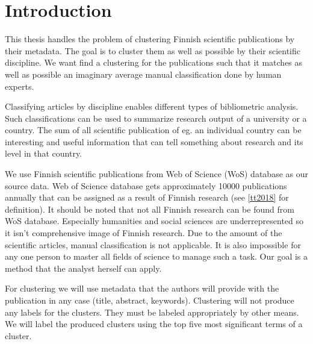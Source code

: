 \chapter{Introduction}
\label{chapter:intro}
This thesis handles the problem of clustering Finnish scientific 
publications by their metadata. The goal is to cluster 
them as well as possible by their scientific discipline. We want 
find a clustering for the publications such that it matches 
as well as possible an imaginary average manual classification 
done by human experts.

Classifying articles by discipline enables different types of 
bibliometric analysis. Such classifications can be used to 
summarize research output of a university or a country.
The sum of all scientific publication of eg. an individual country can be 
interesting and useful information that can tell something about 
research and its level in that country.

We use Finnish scientific publications from  Web of Science (WoS)
database as our source data. 
Web of Science database gets approximately 10000 publications 
annually that can be assigned as a result of Finnish research (see 
\ref{tt2018} for definition).
It should be noted that not all Finnish research can be found from
WoS database. Especially humanities and social sciences are 
underrepresented so it isn't comprehensive image of Finnish 
research.
Due to the amount of the scientific articles, manual 
classification is not applicable. It is also impossible for any 
one person to master all fields of science to manage such a
task. Our goal is a method that the analyst herself can apply.

For clustering we will use metadata that the authors will provide
with the publication in any case (title, abstract, keywords). 
Clustering will not produce any labels for the clusters. They must
be labeled appropriately by other means. We will label the 
produced clusters using the top five most significant terms of a 
cluster.

